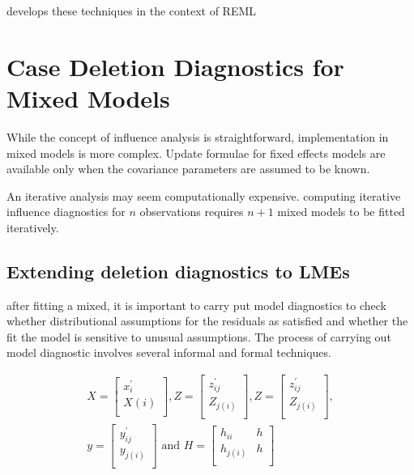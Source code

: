 \documentclass[12pt, a4paper]{report}
\theoremstyle{plain}
\theoremstyle{definition}
\theoremstyle{remark}
\begin{document}
\citet{Christiansen} develops these techniques in the context of REML










\section{Case Deletion Diagnostics for Mixed Models}
While the concept of influence analysis is straightforward,
implementation in mixed models is more complex. Update formulae
for fixed effects models are available only when the covariance
parameters are assumed to be known.


An iterative analysis may seem computationally expensive.
computing iterative influence diagnostics for $n$ observations
requires $n+1$ mixed models to be fitted iteratively.


\subsection{Extending deletion diagnostics to LMEs}
after fitting a mixed, it is important to carry put model
diagnostics to check whether distributional assumptions for the
residuals as satisfied and whether the fit the model is sensitive
to unusual assumptions. The process of carrying out model
diagnostic involves several informal and formal techniques.


\begin{eqnarray*}
	X= \left[%
	\begin{array}{c}
		x^\prime_{i} \\
		X(i) \\
	\end{array}%
	\right],
	Z= \left[%
	\begin{array}{c}
		z^\prime_{ij} \\
		Z_{j(i)} \\
	\end{array}%
	\right] ,
	Z = \left[%
	\begin{array}{c}
		z^\prime_{ij} \\
		Z_{j(i)} \\
	\end{array}%
	\right], \\
	y = \left[%
	\begin{array}{c}
		y^\prime_{ij} \\
		y_{j(i)} \\
	\end{array}%
	\right]
	\mbox{ and } H = \left[%
	\begin{array}{cc}
		h_{ii}& h\\
		h_{j(i)} & h\\
	\end{array}%
	\right]
\end{eqnarray*}
\end{document}
